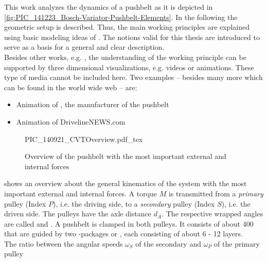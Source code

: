 This work analyzes the dynamics of a pushbelt \CVT as it is depicted in \cref{fig:PIC_141223_Bosch-Variator-Pushbelt-Elements}.
In the following the geometric setup is described.
Thus, the main working principles are explained using basic modeling ideas of \MBSs.
The notions valid for this thesis are introduced to serve as a basis for a general and clear description.\\
Besides other works, e.g. \cite{dittrich_theorie_1953, gerbert_influence_1985, bullinger_dynamik_2005}, the understanding of the working principle can be supported by three dimensional visualizations, e.g. videos or animations.
These type of media cannot be included here.
Two examples -- besides many more which can be found in the world wide web -- are:
\begin{itemize}
  \item Animation of \Bosch, the manufacturer of the pushbelt \cite{bosch_mobility_solutions_en_2013}
  \item Animation of DrivelineNEWS.com \cite{drivelinenews_push_2015}
\end{itemize}
\par
%
\begin{figure}[h!tp]
\begin{center}
  \def\svgwidth{\textwidth}
  {PIC_140921_CVTOverview.pdf_tex}
  \caption[Overview of the pushbelt CVT]{Overview of the pushbelt \CVT with the most important external and internal forces}
  \label{fig:PIC_140921_CVTOverview}
\end{center}
\end{figure}
%
 shows an overview about the general kinematics of the system with the most important external and internal forces.
A torque $M$ is transmitted from a \emph{primary} pulley (Index $P$), i.e. the driving side, to a \emph{secondary} pulley (Index $S$), i.e. the driven side.
The pulleys have the axle distance $d_A$.
The respective wrapped angles are called \PRI and \SEC.
A pushbelt is clamped in both pulleys.
It consists of about 400 \els that are guided by two \ring-packages or \rings, each consisting of about 6 - 12 layers.\\
The ratio between the angular speeds $\omega_S$ of the secondary and $\omega_P$ of the primary pulley 
